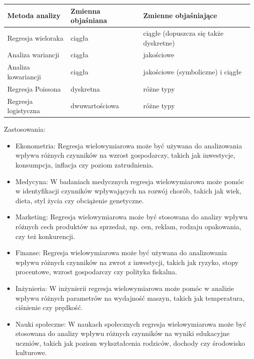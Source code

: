 \documentclass[
  polish,
  letterpaper,
  DIV=11,
  numbers=noendperiod]{scrreprt}
\newcounter{none} %
\begin{document}
{\def\LTcaptype{none} %
\begin{longtable}[]{@{}
  >{\raggedright\arraybackslash}p{}
  >{\raggedright\arraybackslash}p{}
  >{\raggedright\arraybackslash}p{}@{}}
\toprule\noalign{}
\begin{minipage}[b]{\linewidth}\raggedright
Metoda analizy
\end{minipage} & \begin{minipage}[b]{\linewidth}\raggedright
Zmienna objaśniana
\end{minipage} & \begin{minipage}[b]{\linewidth}\raggedright
Zmienne objaśniające
\end{minipage} \\
\midrule\noalign{}
\endhead
\bottomrule\noalign{}
\endlastfoot
Regresja wieloraka & ciągła & ciągłe (dopuszcza się także dyskretne) \\
Analiza wariancji & ciągła & jakościowe \\
Analiza kowariancji & ciągła & jakościowe (symboliczne) i ciągłe \\
Regresja Poissona & dyskretna & różne typy \\
Regresja logistyczna & dwuwartościowa & różne typy \\
\end{longtable}
}

Zastosowania:

\begin{itemize}
\item
  Ekonometria: Regresja wielowymiarowa może być używana do analizowania
  wpływu różnych czynników na wzrost gospodarczy, takich jak inwestycje,
  konsumpcja, inflacja czy poziom zatrudnienia.
\item
  Medycyna: W badaniach medycznych regresja wielowymiarowa może pomóc w
  identyfikacji czynników wpływających na rozwój chorób, takich jak
  wiek, dieta, styl życia czy obciążenie genetyczne.
\item
  Marketing: Regresja wielowymiarowa może być stosowana do analizy
  wpływu różnych cech produktów na sprzedaż, np. cen, reklam, rodzaju
  opakowania, czy też konkurencji.
\item
  Finanse: Regresja wielowymiarowa może być używana do analizowania
  wpływu różnych czynników na zwrot z inwestycji, takich jak ryzyko,
  stopy procentowe, wzrost gospodarczy czy polityka fiskalna.
\item
  Inżynieria: W inżynierii regresja wielowymiarowa może pomóc w analizie
  wpływu różnych parametrów na wydajność maszyn, takich jak temperatura,
  ciśnienie czy prędkość.
\item
  Nauki społeczne: W naukach społecznych regresja wielowymiarowa może
  być stosowana do analizy wpływu różnych czynników na wyniki edukacyjne
  uczniów, takich jak poziom wykształcenia rodziców, dochody czy
  środowisko kulturowe.
\end{itemize}
\end{document}
